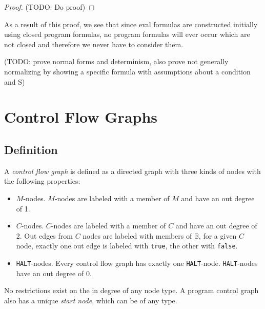 \documentclass[11pt]{article}
\begin{document}
\begin{proof}
(TODO: Do proof)
\end{proof}

As a result of this proof, we see that since eval formulas are constructed initially using closed program formulas, no program formulas will ever occur which are not closed and therefore we never have to consider them.

(TODO: prove normal forms and determinism, also prove not generally normalizing by showing a specific formula with assumptions about a condition and S)

\section{Control Flow Graphs}

\subsection{Definition}

A \emph{control flow graph} is defined as a directed graph with three kinds of nodes with the following properties:

\begin{itemize}
\item $M$-nodes.  $M$-nodes are labeled with a member of $M$ and have an out degree of 1.
\item $C$-nodes.  $C$-nodes are labeled with a member of $C$ and have an out degree of 2.  Out edges from $C$ nodes are labeled with members of $\mathbb{B}$, for a given $C$ node, exactly one out edge is labeled with \texttt{true}, the other with \texttt{false}.
\item \texttt{HALT}-nodes.  Every control flow graph has exactly one \texttt{HALT}-node.  \texttt{HALT}-nodes have an out degree of 0.
\end{itemize}

No restrictions exist on the in degree of any node type.  A program control graph also has a unique \emph{start node}, which can be of any type.
\end{document}
